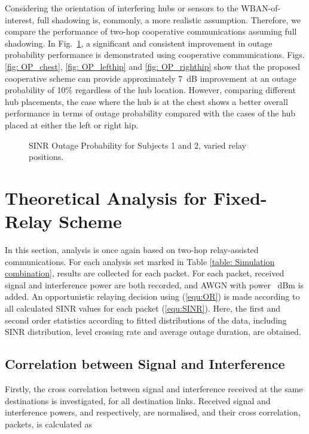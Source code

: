 \documentclass[12pt,draftcls,a4paper,onecolumn,journal]{IEEEtran}
\begin{document}
Considering the orientation of interfering hubs or sensors to the WBAN-of-interest, full shadowing is, commonly, a more realistic assumption. Therefore, we compare the performance of two-hop cooperative communications assuming full shadowing. In Fig.~\ref{fig: outage probability_varyRelay}, a significant and consistent improvement in outage probability performance is demonstrated using cooperative communications. Figs. \ref{fig: OP_chest}, \ref{fig: OP_lefthip} and \ref{fig: OP_righthip} show that the proposed cooperative scheme can provide approximately 7~dB improvement at an outage probability of 10\% regardless of the hub location. However, comparing different hub placements, the case where the hub is at the chest shows a better overall performance in terms of outage probability compared with the cases of the hub placed at either the left or right hip.

\begin{figure}[]
\centering
{}
\caption{SINR Outage Probability for Subjects 1 and 2, varied relay positions.}
\label{fig: outage probability_varyRelay}
\end{figure}

\section{Theoretical Analysis for Fixed-Relay Scheme}
In this section, analysis is once again based on two-hop relay-assisted communications. For each analysis set marked in Table \ref{table: Simulation combination}, results are collected for each packet. For each packet, received signal and interference power are both recorded, and AWGN with power ~dBm is added. An opportunistic relaying decision using (\ref{equ:OR}) is made according to all calculated SINR values for each packet (\ref{equ:SINR}). Here, the first and second order statistics according to fitted distributions of the data, including SINR distribution, level crossing rate and average outage duration, are obtained.

\subsection{Correlation between Signal and Interference}
Firstly, the cross correlation between signal and interference received at the same destinations is investigated, for all destination links. Received signal and interference powers,  and  respectively, are normalised, and their cross correlation,  packets, is calculated as
\end{document}
